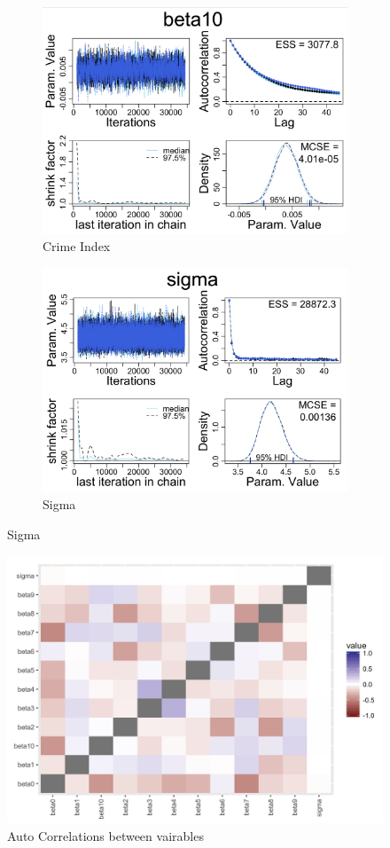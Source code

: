 \documentclass[12pt,english]{article}
\begin{document}
\begin{figure}[h]
 
\begin{subfigure}{0.5\textwidth}
\includegraphics[scale = 0.25]{beta10.png} 
\caption{Crime Index}
\label{fig:beta0}
\end{subfigure}
\begin{subfigure}{0.5\textwidth}
\includegraphics[scale = 0.25]{sigma.png}
\caption{Sigma}
\label{fig:subim2}
\end{subfigure}
\label{fig:beta1}
\end{figure}

\begin{figure}[h]
\caption{Auto Correlations between vairables }
\includegraphics[scale=0.5]{Correlation.png}
\centering
\end{figure}
\end{document}
